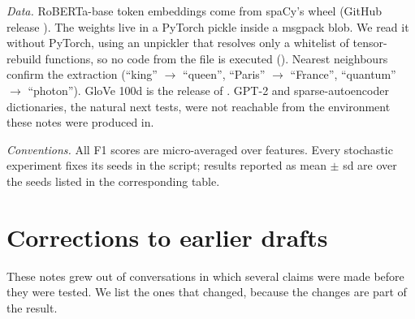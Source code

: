 {\sloppy\emph{Data.} RoBERTa-base token embeddings come from spaCy's  wheel (GitHub release
). The weights live in a PyTorch pickle inside a msgpack blob. We read it without
PyTorch, using an unpickler that resolves only a whitelist of tensor-rebuild functions, so no code from the file is
executed (). Nearest neighbours confirm the extraction (``king'' $\to$
``queen'', ``Paris'' $\to$ ``France'', ``quantum'' $\to$ ``photon''). GloVe 100d is the 
release of . GPT-2 and sparse-autoencoder dictionaries, the natural next tests,
were not reachable from the environment these notes were produced in.\par}

\emph{Conventions.} All F1 scores are micro-averaged over features. Every stochastic experiment fixes its seeds in the
script; results reported as mean $\pm$ sd are over the seeds listed in the corresponding table.

\section{Corrections to earlier drafts}\label{app:corrections}

These notes grew out of conversations in which several claims were made before they were tested. We list the ones
that changed, because the changes are part of the result.

